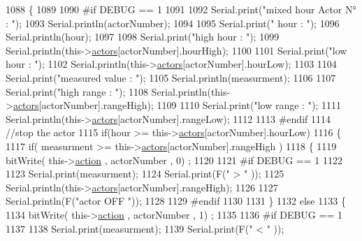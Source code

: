 \begin{DoxyCode}
1088 \{
1089 
1090 \textcolor{preprocessor}{#if DEBUG == 1}
1091     
1092     Serial.print(\textcolor{stringliteral}{"mixed hour Actor N° : "});
1093     Serial.println(actorNumber);
1094 
1095     Serial.print(\textcolor{stringliteral}{" hour : "});
1096     Serial.println(hour);
1097 
1098     Serial.print(\textcolor{stringliteral}{"high hour : "});
1099     Serial.println(this->\hyperlink{class_jetpack_a7e16d2f97837f9712a2e6de1c50d99db}{actors}[actorNumber].hourHigh);
1100 
1101     Serial.print(\textcolor{stringliteral}{"low hour : "});
1102     Serial.println(this->\hyperlink{class_jetpack_a7e16d2f97837f9712a2e6de1c50d99db}{actors}[actorNumber].hourLow);
1103 
1104     Serial.print(\textcolor{stringliteral}{"measured value : "});
1105     Serial.println(measurment);
1106 
1107     Serial.print(\textcolor{stringliteral}{"high range : "});
1108     Serial.println(this->\hyperlink{class_jetpack_a7e16d2f97837f9712a2e6de1c50d99db}{actors}[actorNumber].rangeHigh);
1109 
1110     Serial.print(\textcolor{stringliteral}{"low range : "});
1111     Serial.println(this->\hyperlink{class_jetpack_a7e16d2f97837f9712a2e6de1c50d99db}{actors}[actorNumber].rangeLow);
1112 
1113 \textcolor{preprocessor}{#endif}
1114     \textcolor{comment}{//stop the actor    }
1115     \textcolor{keywordflow}{if}(hour >= this->\hyperlink{class_jetpack_a7e16d2f97837f9712a2e6de1c50d99db}{actors}[actorNumber].hourLow)
1116     \{
1117             \textcolor{keywordflow}{if}( measurment >= this->\hyperlink{class_jetpack_a7e16d2f97837f9712a2e6de1c50d99db}{actors}[actorNumber].rangeHigh )
1118             \{
1119                 bitWrite( this->\hyperlink{class_jetpack_aca3142925a7b0834b34ae91d26af7765}{action} , actorNumber , 0) ;
1120 
1121 \textcolor{preprocessor}{            #if DEBUG == 1 }
1122 
1123                 Serial.print(measurment);
1124                 Serial.print(F(\textcolor{stringliteral}{" > "} ));
1125                 Serial.println(this->\hyperlink{class_jetpack_a7e16d2f97837f9712a2e6de1c50d99db}{actors}[actorNumber].rangeHigh);
1126 
1127                 Serial.println(F(\textcolor{stringliteral}{"actor OFF "}));
1128 
1129 \textcolor{preprocessor}{            #endif  }
1130 
1131             \}
1132             \textcolor{keywordflow}{else} 
1133             \{
1134                 bitWrite( this->\hyperlink{class_jetpack_aca3142925a7b0834b34ae91d26af7765}{action} , actorNumber , 1) ;
1135 
1136 \textcolor{preprocessor}{            #if DEBUG == 1 }
1137 
1138                 Serial.print(measurment);
1139                 Serial.print(F(\textcolor{stringliteral}{" < "} ));

\end{DoxyCode}
